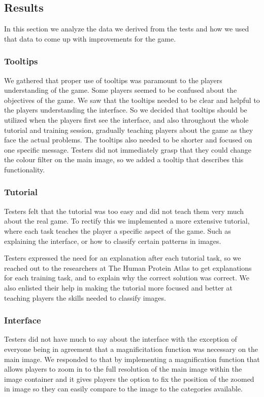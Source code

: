 \subsection{Results}

In this section we analyze the data we derived from the tests and how we used that data to come up with improvements for the game.

\subsubsection{Tooltips}
We gathered that proper use of tooltips was paramount to the players understanding of the game. Some players seemed to be confused about the objectives of the game. We saw that the tooltips needed to be clear and helpful to the players understanding the interface. So we decided that tooltips should be utilized when the players first see the interface, and also throughout the whole tutorial and training session, gradually teaching players about the game as they face the actual problems. The tooltips also needed to be shorter and focused on one specific message. Testers did not immediately grasp that they could change the colour filter on the main image, so we added a tooltip that describes this functionality.

\subsubsection{Tutorial}
Testers felt that the tutorial was too easy and did not teach them very much about the real game. To rectify this we implemented a more extensive tutorial, where each task teaches the player a specific aspect of the game. Such as explaining the interface, or how to classify certain patterns in images. 

Testers expressed the need for an explanation after each tutorial task, so we reached out to the researchers at The Human Protein Atlas to get explanations for each training task, and to explain why the correct solution was correct. We also enlisted their help in making the tutorial more focused and better at teaching players the skills needed to classify images.

\subsubsection{Interface}
Testers did not have much to say about the interface with the exception of everyone being in agreement that a magnificitation function was necessary on the main image. We responded to that by implementing a magnification function that allows players to zoom in to the full resolution of the main image within the image container and it gives players the option to fix the position of the zoomed in image so they can easily compare to the image to the categories available.

